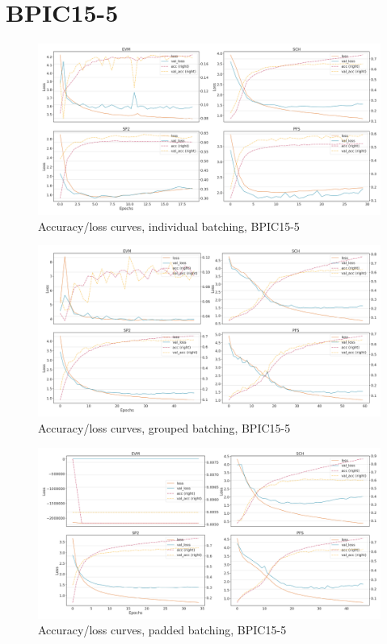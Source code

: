 \section*{BPIC15-5}
\begin{figure}[!htb]
    \centering
    \includegraphics[width=\textwidth]{gfx/bpic2015_5/individual_loss_acc_curve.png}
    \caption{Accuracy/loss curves, individual batching, BPIC15-5}
\end{figure}
\begin{figure}[!htb]
    \centering
    \includegraphics[width=\textwidth]{gfx/bpic2015_5/grouped_loss_acc_curve.png}
    \caption{Accuracy/loss curves, grouped batching, BPIC15-5}
\end{figure}
\begin{figure}[!htb]
    \centering
    \includegraphics[width=\textwidth]{gfx/bpic2015_5/padded_loss_acc_curve.png}
    \caption{Accuracy/loss curves, padded batching, BPIC15-5}
\end{figure}
